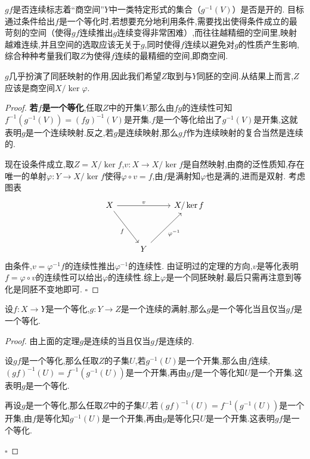 \documentclass[../../几何与拓扑.tex]{subfiles}
\begin{document}
\begin{note}
     $gf$是否连续标志着“商空间”$Y$中一类特定形式的集合（$g^{-1}\left( V \right)$）是否是开的.
目标通过条件给出$f$是一个等化时,若想要充分地利用条件,需要找出使得条件成立的最苛刻的空间（使得$gf$连续推出$g$连续变得非常困难）,而往往越精细的空间里,映射越难连续,并且空间的选取应该无关于$g$,同时使得$f$连续以避免对$g$的性质产生影响,综合种种考量我们取$Z$为使得$f$连续的最精细的空间,即商空间.

$g$几乎扮演了同胚映射的作用,因此我们希望$Z$取到与$Y$同胚的空间.从结果上而言,$Z$应该是商空间$X/ \ker \varphi$.

\end{note}
\begin{proof}
    \textbf{若$f$是一个等化},任取$Z$中的开集$V$,那么由$fg$的连续性可知$f^{-1}\left( g^{-1}\left( V \right) \right)=\left( fg \right)^{-1}\left( V \right)$是开集.$f$是一个等化给出了$g^{-1}\left( V \right)$是开集,这就表明$g$是一个连续映射.反之,若$g$是连续映射,那么$gf$作为连续映射的复合当然是连续的.

现在设条件成立,取$Z = X /\ker f$,$v:X \to X/\ker f$是自然映射,由商的泛性质知,存在唯一的单射$\varphi:Y \to X /\ker f$使得$\varphi \circ v=f$,由$f$是满射知$\varphi$也是满的,进而是双射.
考虑图表
\[
  \begin{tikzcd} X && {X/\ker f} \\ \\ & Y \arrow["v", from=1-1, to=1-3] \arrow["f"', from=1-1, to=3-2] \arrow["{\varphi^{-1}}"', from=3-2, to=1-3] \end{tikzcd}  
\]
由条件,$v = \varphi ^{-1}f$的连续性推出$\varphi ^{-1}$的连续性.
由证明过的定理的方向,$v$是等化表明$f= \varphi \circ v$的连续性可以给出$\varphi$的连续性.综上$\varphi$是一个同胚映射.最后只需再注意到等化是同胚不变地即可.
    \hfill $\square$
\end{proof}


\begin{lemma}
    设$f:X\to Y$是一个等化,$g:Y\to Z$是一个连续的满射,那么$g$是一个等化当且仅当$gf$是一个等化.

\end{lemma}

\begin{proof}
   由上面的定理$g$是连续的当且仅当$gf$是连续的.

设$gf$是一个等化,那么任取$Z$的子集$U$,若$g^{-1}\left( U \right)$是一个开集,那么由$f$连续,$\left( gf \right)^{-1}\left( U \right)=f^{-1}\left( g^{-1}\left( U \right) \right)$是一个开集,再由$gf$是一个等化知$U$是一个开集.这表明$g$是一个等化.

再设$g$是一个等化,那么任取$Z$中的子集$U$,若$\left( gf \right)^{-1}\left( U \right)=f^{-1}\left( g^{-1}\left( U \right) \right)$是一个开集,由$f$是等化知$g^{-1}\left( U \right)$是一个开集,再由$g$是等化只$U$是一个开集.这表明$gf$是一个等化.

    \hfill $\square$
\end{proof}
\end{document}
